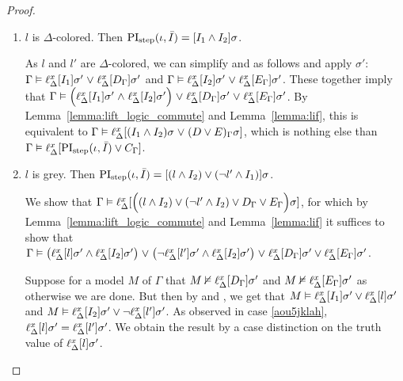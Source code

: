 \begin{proof}
\begin{description}
\begin{enumerate}
				\item $l$ is $\Delta$-colored. Then $\operatorname{PI}_{\mathrm{step}}(\iota, \bar I) = [I_1 \land I_2]\sigma$.

					As $l$ and $l'$ are $\Delta$-colored, we can simplify \markA{} and \markB{} as follows and apply $\sigma'$:
					$\Gamma \vDash \ell_{\Delta}^{x}[I_1]\sigma' \;{\lor}\; \ell_{\Delta}^{x}[D_\Gamma]\sigma' $ and $\Gamma \vDash \ell_{\Delta}^{x}[I_2]\sigma' \;{\lor}\; \ell_{\Delta}^{x}[E_\Gamma]\sigma'$.
					These together imply that 
					$\Gamma \vDash \Big(\ell_{\Delta}^{x}[I_1]\sigma' \;{\land}\; \ell_{\Delta}^{x}[I_2]\sigma'\Big) \;{\lor}\;\allowbreak \ell_{\Delta}^{x}[D_\Gamma]\sigma' \;{\lor}\;\allowbreak \ell_{\Delta}^{x}[E_\Gamma]\sigma'$.
					By Lemma~\ref{lemma:lift_logic_commute} and Lemma~\ref{lemma:lif}, this is equivalent to 
					$\Gamma \vDash \ell_{\Delta}^{x}[(I_1 \land I_2)\sigma \;{\lor}\; (D \lor E)_\Gamma\sigma]$, which is nothing else than
					$\Gamma \vDash \ell_{\Delta}^{x}[\operatorname{PI}_{\mathrm{step}}(\iota, \bar I) \lor C_\Gamma]$.

				\item $l$ is grey. Then $\operatorname{PI}_{\mathrm{step}}(\iota, \bar I) = [(l \land I_2 ) \lor (\lnot l' \land I_1)]\sigma$.

					We show that $\Gamma \vDash\allowbreak \ell_{\Delta}^{x}[ \Big((l \land I_2 ) \lor\allowbreak (\lnot l' \land I_2) \lor D_\Gamma \lor E_\Gamma\Big)\sigma]$, for which by Lemma~\ref{lemma:lift_logic_commute} and Lemma~\ref{lemma:lif} it suffices to show that 
					$\Gamma \vDash\allowbreak \big(\ell_{\Delta}^{x}[l]\sigma' \land \ell_{\Delta}^{x}[I_2]\sigma'\big)\;{\lor}\;\allowbreak \big(\lnot \ell_{\Delta}^{x}[l']\sigma' \land \ell_{\Delta}^{x}[I_2]\sigma'\big)\;{\lor}\;\allowbreak \ell_{\Delta}^{x}[D_\Gamma]\sigma' \lor \ell_{\Delta}^{x}[E_\Gamma]\sigma'$.

					Suppose for a model $M$ of $\Gamma$ that  $M \nvDash \ell_{\Delta}^{x}[D_\Gamma]\sigma'$ and $M\nvDash \ell_{\Delta}^{x}[E_\Gamma]\sigma'$ as otherwise we are done.
					But then by \markA{} and \markB{}, we get that 
					$M \vDash \ell_{\Delta}^{x}[I_1]\sigma' \lor \ell_{\Delta}^{x}[l]\sigma'$ and
					$M \entails\nolinebreak \lifdelta{I_2}\sigma' \lor \lnot\lifdelta{l'}\sigma'$.
					As observed in case \ref{aou5jklah}, $\ell_{\Delta}^{x}[l]\sigma' = \ell_{\Delta}^{x}[l']\sigma'$.
					We obtain the result by a case distinction on the truth value of $\ell_{\Delta}^{x}[l]\sigma'$.

			\end{enumerate}
	\end{description}
\end{proof}

